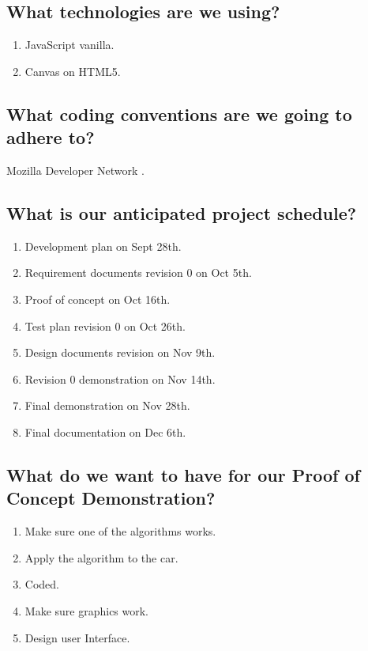 \documentclass[11pt]{meetingmins}
\begin{document}
	\subsection{What technologies are we using?}
		\begin{enumerate}
			\item{JavaScript vanilla.}
			\item{Canvas on HTML5.}
		\end{enumerate}

	\subsection{What coding conventions are we going to adhere to?}
		Mozilla Developer Network .
		
	\subsection{What is our anticipated project schedule?}
		\begin{enumerate}
			\item{Development plan on Sept 28th.}
			\item{Requirement documents revision 0 on Oct 5th.}
			\item{Proof of concept on Oct 16th.}
			\item{Test plan revision 0 on Oct 26th.}
			\item{Design documents revision on Nov 9th.}
			\item{Revision 0 demonstration on Nov 14th.}
			\item{Final demonstration on Nov 28th.}
			\item{Final documentation on Dec 6th.}
		\end{enumerate}
		
	\subsection{What do we want to have for our Proof of Concept Demonstration?}
		\begin{enumerate}
			\item{Make sure one of the algorithms works.}
			\item{Apply the algorithm to the car.}
			\item{Coded.}
			\item{Make sure graphics work.}
			\item{Design user Interface.}
		\end{enumerate}
		
\end{document}
